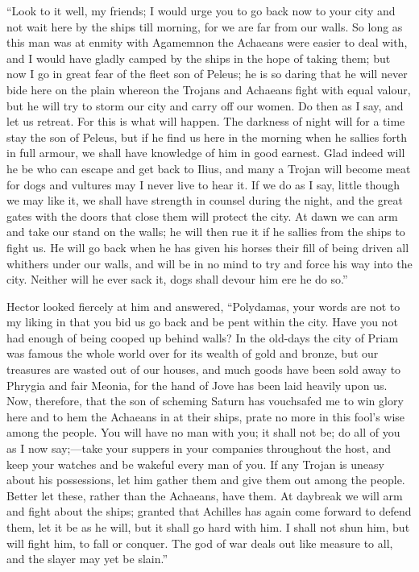 “Look to it well, my friends; I would urge you to go back now to your city
and not wait here by the ships till morning, for we are far from our
walls. So long as this man was at enmity with Agamemnon the Achaeans were
easier to deal with, and I would have gladly camped by the ships in the
hope of taking them; but now I go in great fear of the fleet son of
Peleus; he is so daring that he will never bide here on the plain whereon
the Trojans and Achaeans fight with equal valour, but he will try to storm
our city and carry off our women. Do then as I say, and let us retreat.
For this is what will happen. The darkness of night will for a time stay
the son of Peleus, but if he find us here in the morning when he sallies
forth in full armour, we shall have knowledge of him in good earnest. Glad
indeed will he be who can escape and get back to Ilius, and many a Trojan
will become meat for dogs and vultures may I never live to hear it. If we
do as I say, little though we may like it, we shall have strength in
counsel during the night, and the great gates with the doors that close
them will protect the city. At dawn we can arm and take our stand on the
walls; he will then rue it if he sallies from the ships to fight us. He
will go back when he has given his horses their fill of being driven all
whithers under our walls, and will be in no mind to try and force his way
into the city. Neither will he ever sack it, dogs shall devour him ere he
do so.”

Hector looked fiercely at him and answered, “Polydamas, your words are not
to my liking in that you bid us go back and be pent within the city. Have
you not had enough of being cooped up behind walls? In the old-days the
city of Priam was famous the whole world over for its wealth of gold and
bronze, but our treasures are wasted out of our houses, and much goods
have been sold away to Phrygia and fair Meonia, for the hand of Jove has
been laid heavily upon us. Now, therefore, that the son of scheming Saturn
has vouchsafed me to win glory here and to hem the Achaeans in at their
ships, prate no more in this fool’s wise among the people. You will have
no man with you; it shall not be; do all of you as I now say;—take
your suppers in your companies throughout the host, and keep your watches
and be wakeful every man of you. If any Trojan is uneasy about his
possessions, let him gather them and give them out among the people.
Better let these, rather than the Achaeans, have them. At daybreak we will
arm and fight about the ships; granted that Achilles has again come
forward to defend them, let it be as he will, but it shall go hard with
him. I shall not shun him, but will fight him, to fall or conquer. The god
of war deals out like measure to all, and the slayer may yet be slain.”

